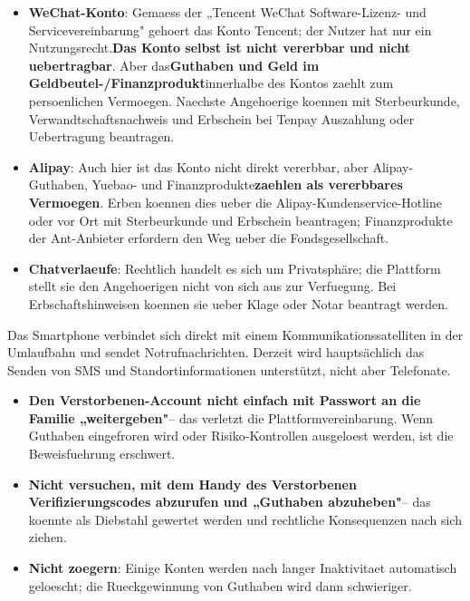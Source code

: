\begin{itemize}
  \item \textbf{WeChat-Konto}: Gemaess der „Tencent WeChat Software-Lizenz- und Servicevereinbarung" gehoert das Konto Tencent; der Nutzer hat nur ein Nutzungsrecht.\textbf{Das Konto selbst ist nicht vererbbar und nicht uebertragbar}. Aber das\textbf{Guthaben und Geld im Geldbeutel-/Finanzprodukt}innerhalbe des Kontos zaehlt zum persoenlichen Vermoegen. Naechste Angehoerige koennen mit Sterbeurkunde, Verwandtschaftsnachweis und Erbschein bei Tenpay Auszahlung oder Uebertragung beantragen.
  \item \textbf{Alipay}: Auch hier ist das Konto nicht direkt vererbbar, aber Alipay-Guthaben, Yuebao- und Finanzprodukte\textbf{zaehlen als vererbbares Vermoegen}. Erben koennen dies ueber die Alipay-Kundenservice-Hotline oder vor Ort mit Sterbeurkunde und Erbschein beantragen; Finanzprodukte der Ant-Anbieter erfordern den Weg ueber die Fondsgesellschaft.
  \item \textbf{Chatverlaeufe}: Rechtlich handelt es sich um Privatsphäre; die Plattform stellt sie den Angehoerigen nicht von sich aus zur Verfuegung. Bei Erbschaftshinweisen koennen sie ueber Klage oder Notar beantragt werden.
\end{itemize}

\begin{tcbwarn}{Das Smartphone verbindet sich direkt mit einem Kommunikationssatelliten in der Umlaufbahn und sendet Notrufnachrichten. Derzeit wird hauptsächlich das Senden von SMS und Standortinformationen unterstützt, nicht aber Telefonate.}
\begin{itemize}
  \item \textbf{Den Verstorbenen-Account nicht einfach mit Passwort an die Familie „weitergeben"}– das verletzt die Plattformvereinbarung. Wenn Guthaben eingefroren wird oder Risiko-Kontrollen ausgeloest werden, ist die Beweisfuehrung erschwert.
  \item \textbf{Nicht versuchen, mit dem Handy des Verstorbenen Verifizierungscodes abzurufen und „Guthaben abzuheben"}– das koennte als Diebstahl gewertet werden und rechtliche Konsequenzen nach sich ziehen.
  \item \textbf{Nicht zoegern}: Einige Konten werden nach langer Inaktivitaet automatisch geloescht; die Rueckgewinnung von Guthaben wird dann schwieriger.
\end{itemize}

\end{tcbwarn}


